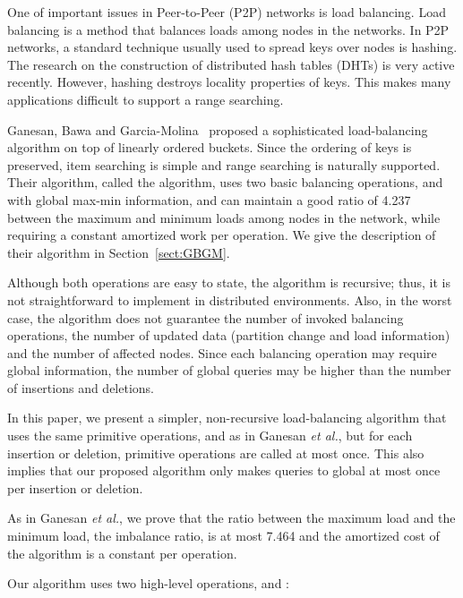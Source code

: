 \documentclass[a4paper]{article}
\begin{document}
One of important issues in Peer-to-Peer (P2P) networks is load balancing.
Load balancing is a method that balances loads among nodes in the
networks. In P2P networks, a standard technique usually used
to spread keys over nodes is hashing.  The research on the
construction of distributed hash tables (DHTs) is very active
recently. However, hashing destroys locality properties of keys. This
makes many applications difficult to support a range searching.

Ganesan, Bawa and Garcia-Molina~\cite{GanesanBGM04-vldb} proposed a
sophisticated load-balancing algorithm on top of linearly ordered
buckets. Since the ordering of keys is preserved, item searching is
simple and  range searching is naturally supported.  Their algorithm,
called the {\adjload} algorithm, uses two basic balancing operations,
{\nbradj} and {\reorder} with global max-min information, and can
maintain a good ratio of 4.237 between the maximum and minimum loads
among nodes in the network, while requiring a constant amortized work
per operation. We give the description of their algorithm in
Section~\ref{sect:GBGM}.



Although both operations are easy to state, the {\adjload} algorithm
is recursive; thus, it is not straightforward to implement in
distributed environments.  Also, in the worst case, the {\adjload}
algorithm does not guarantee the number of invoked balancing
operations, the number of updated data (partition change and load
information) and the number of affected nodes.  Since each balancing
operation may require global information, the number of global queries
may be higher than the number of insertions and deletions.

In this paper, we present a simpler, non-recursive load-balancing
algorithm that uses the same primitive operations, {\nbradj} and
{\reorder} as in Ganesan {\em et al.}, but for each insertion or
deletion, primitive operations are called at most once.  
This also implies that our proposed algorithm 
only makes queries to global at most once per insertion or deletion.  

As in Ganesan {\em et al.}, we prove that the ratio between the maximum
load and the minimum load, the imbalance ratio, is at most 7.464 and
the amortized cost of the algorithm is a constant per operation.

Our algorithm uses two high-level operations, {\minbalance} and
{\split}:  
\end{document}

